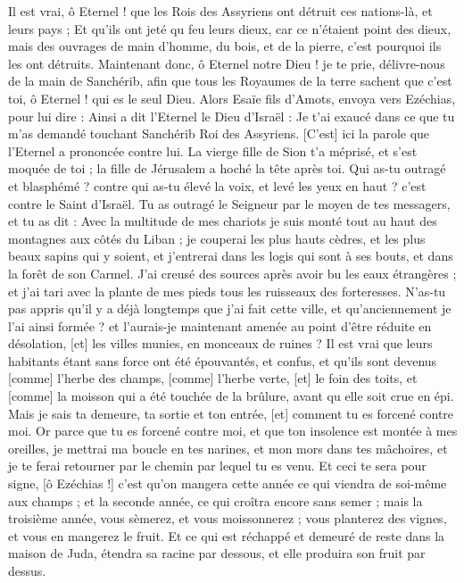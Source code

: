 \begin{multicols}{2}
Il est vrai, ô Eternel ! que les Rois des Assyriens ont détruit ces nations-là, et leurs pays ;
Et qu'ils ont jeté qu feu leurs dieux, car ce n'étaient point des dieux, mais des ouvrages de main d'homme, du bois, et de la pierre, c'est pourquoi ils les ont détruits.
Maintenant donc, ô Eternel notre Dieu ! je te prie, délivre-nous de la main de Sanchérib, afin que tous les Royaumes de la terre sachent que c'est toi, ô Eternel ! qui es le seul Dieu.
Alors Esaïe fils d'Amots, envoya vers Ezéchias, pour lui dire : Ainsi a dit l'Eternel le Dieu d'Israël : Je t'ai exaucé dans ce que tu m'as demandé touchant Sanchérib Roi des Assyriens.
[C'est] ici la parole que l'Eternel a prononcée contre lui. La vierge fille de Sion t'a méprisé, et s'est moquée de toi ; la fille de Jérusalem a hoché la tête après toi.
Qui as-tu outragé et blasphémé ? contre qui as-tu élevé la voix, et levé les yeux en haut ? c'est contre le Saint d'Israël.
Tu as outragé le Seigneur par le moyen de tes messagers, et tu as dit : Avec la multitude de mes chariots je suis monté tout au haut des montagnes aux côtés du Liban ; je couperai les plus hauts cèdres, et les plus beaux sapins qui y soient, et j'entrerai dans les logis qui sont à ses bouts, et dans la forêt de son Carmel.
J'ai creusé des sources après avoir bu les eaux étrangères ; et j'ai tari avec la plante de mes pieds tous les ruisseaux des forteresses.
N'as-tu pas appris qu'il y a déjà longtemps que j'ai fait cette ville, et qu'anciennement je l'ai ainsi formée ? et l'aurais-je maintenant amenée au point d'être réduite en désolation, [et] les villes munies, en monceaux de ruines ?
Il est vrai que leurs habitants étant sans force ont été épouvantés, et confus, et qu'ils sont devenus [comme] l'herbe des champs, [comme] l'herbe verte, [et] le foin des toits, et [comme] la moisson qui a été touchée de la brûlure, avant qu elle soit crue en épi.
Mais je sais ta demeure, ta sortie et ton entrée, [et] comment tu es forcené contre moi.
Or parce que tu es forcené contre moi, et que ton insolence est montée à mes oreilles, je mettrai ma boucle en tes narines, et mon mors dans tes mâchoires, et je te ferai retourner par le chemin par lequel tu es venu.
Et ceci te sera pour signe, [ô Ezéchias !] c'est qu'on mangera cette année ce qui viendra de soi-même aux champs ; et la seconde année, ce qui croîtra encore sans semer ; mais la troisième année, vous sèmerez, et vous moissonnerez ; vous planterez des vignes, et vous en mangerez le fruit.
Et ce qui est réchappé et demeuré de reste dans la maison de Juda, étendra sa racine par dessous, et elle produira son fruit par dessus.

\end{multicols}
